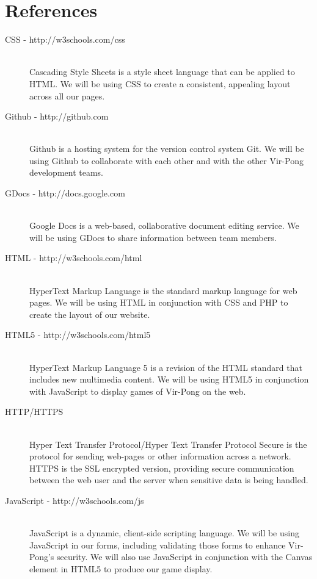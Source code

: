 %

\section{References}

	\begin{description}
	
		\item[CSS - http://w3schools.com/css] \hfill \\
			Cascading Style Sheets is a style sheet language that can be applied to HTML. We will be using CSS to create a consistent, appealing layout across all our pages.
		\item[Github - http://github.com] \hfill \\
			Github is a hosting system for the version control system Git. We will be using Github to collaborate with each other and with the other Vir-Pong development teams.
		\item[GDocs - http://docs.google.com] \hfill \\
			Google Docs is a web-based, collaborative document editing service. We will be using GDocs to share information between team members.
		\item[HTML - http://w3schools.com/html] \hfill \\
			HyperText Markup Language is the standard markup language for web pages. We will be using HTML in conjunction with CSS and PHP to create the layout of our website.
		\item[HTML5 - http://w3schools.com/html5] \hfill \\
			HyperText Markup Language 5 is a revision of the HTML standard that includes new multimedia content. We will be using HTML5 in conjunction with JavaScript to display games of Vir-Pong on the web.
		\item[HTTP/HTTPS] \hfill \\
			Hyper Text Transfer Protocol/Hyper Text Transfer Protocol Secure is the  protocol for sending web-pages or other information across a network. HTTPS is the SSL encrypted version, providing secure communication between the web user and the server when sensitive data is being handled.
		\item[JavaScript - http://w3schools.com/js] \hfill \\
			JavaScript is a dynamic, client-side scripting language. We will be using JavaScript in our forms, including validating those forms to enhance Vir-Pong's security. We will also use JavaScript in conjunction with the Canvas element in HTML5 to produce our game display.

\end{description}

